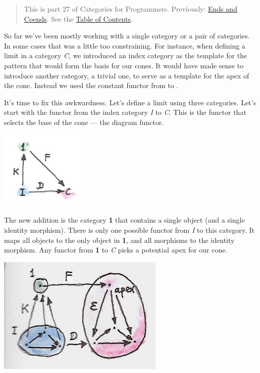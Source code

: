 \begin{quote}
This is part 27 of Categories for Programmers. Previously:
\href{https://bartoszmilewski.com/2017/03/29/ends-and-coends/}{Ends and
Coends}. See the
\href{https://bartoszmilewski.com/2014/10/28/category-theory-for-programmers-the-preface/}{Table
of Contents}.
\end{quote}

So far we've been mostly working with a single category or a pair of
categories. In some cases that was a little too constraining. For
instance, when defining a limit in a category \emph{C}, we introduced an
index category  as the template for the pattern that would
form the basis for our cones. It would have made sense to introduce
another category, a trivial one, to serve as a template for the apex of
the cone. Instead we used the constant functor  from
 to .

It's time to fix this awkwardness. Let's define a limit using three
categories. Let's start with the functor  from the index
category \emph{I} to \emph{C}. This is the functor that selects the base
of the cone --- the diagram functor.

\includegraphics[width=1.70833in]{images/kan2.jpg}

The new addition is the category \textbf{1} that contains a single
object (and a single identity morphism). There is only one possible
functor  from \emph{I} to this category. It maps all objects
to the only object in \textbf{1}, and all morphisms to the identity
morphism. Any functor  from \textbf{1} to \emph{C} picks a
potential apex for our cone.

\includegraphics[width=3.12500in]{images/kan15.jpg}

